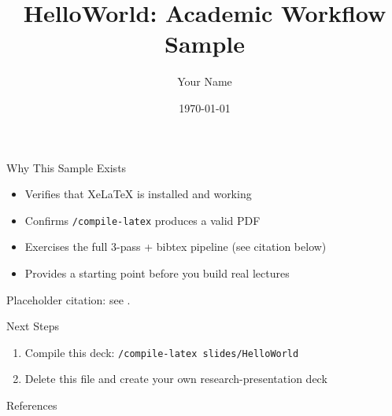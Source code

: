 \documentclass{beamer}
\title{HelloWorld: Academic Workflow Sample}
\author{Your Name}
\institute{Your Institution}
\date{\today}
\begin{document}
\frame{\titlepage}

\begin{frame}{Why This Sample Exists}
    \begin{itemize}
        \item Verifies that XeLaTeX is installed and working
        \item Confirms \texttt{/compile-latex} produces a valid PDF
        \item Exercises the full 3-pass + bibtex pipeline (see citation below)
        \item Provides a starting point before you build real lectures
    \end{itemize}
    Placeholder citation: see \cite{Example2024_book}.
\end{frame}

\begin{frame}{Next Steps}
    \begin{enumerate}
        \item Compile this deck: \texttt{/compile-latex slides/HelloWorld}
        \item Delete this file and create your own research-presentation deck
    \end{enumerate}
\end{frame}

\begin{frame}{References}
    
    
\end{frame}
\end{document}
